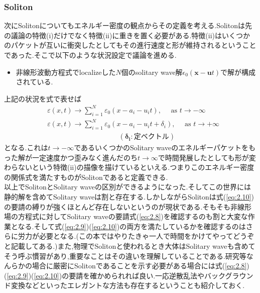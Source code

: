 \documentclass[dvipdfmx,11pt,a4paper]{jsbook}
\begin{document}
\subsubsection{Soliton}
次にSolitonについてもエネルギー密度の観点からその定義を考える.Solitonは先の議論の特徴(i)だけでなく特徴(ii)に重きを置く必要がある.特徴(ii)はいくつかのパケットが互いに衝突したとしてもその進行速度と形が維持されるということであった.そこで以下のような状況設定で議論を進める.
\begin{itemize}
    \item 非線形波動方程式でlocalizeした$N$個のsolitary wave解$\epsilon_0(\bm{x}-\bm{u}t)$で解が構成されている.
\end{itemize}
上記の状況を式で表せば
\begin{align}
     & \varepsilon(x, t) \rightarrow \sum_{i=1}^{N} \varepsilon_{0}\left(x-a_{i}-u_{i} t\right), \quad \text { as } t \rightarrow-\infty\label{eq:2.9}             \\
     & \varepsilon(x, t) \rightarrow \sum_{i=1}^{N} \varepsilon_{0}\left(x-a_{i}-u_{i} t+\delta_{i}\right), \quad \text { as } t \rightarrow+\infty\label{eq:2.10} \\
     & \qquad \ \ \ \ \ \ \ \ \ \ \ \ \ \ \ \ \ \ \ \ \  \ \ \ \ \ \ \ \ \ \ \ \ \ \ \ \ (\bm{\delta_i}:\text{定ベクトル})\nonumber
\end{align}
となる.これは$t\rightarrow -\infty$であるいくつかのSolitary waveのエネルギーパケットをもった解が一定速度かつ歪みなく進んだのち$t\rightarrow \infty$で時間発展したとしても形が変わらないという特徴(ii)の描像を描けているといえる.つまりこのエネルギー密度の関係式を満たすものがSolitonであると定義できる.\\

以上でSolitonとSolitary waveの区別ができるようになった.そしてこの世界には静的解を含めてSolitary waveは割と存在する.しかしながらSolitonは式(\ref{eq:2.10})の要請の縛りが強くほとんど存在しないというのが現状である.そもそも非線形場の方程式に対してSolitary waveの要請式(\ref{eq:2.8})を確認するのも割と大変な作業となる.そして式(\ref{eq:2.9})(\ref{eq:2.10})の両方を満たしているかを確認するのはさらに労力が必要となる.(この本ではやりたきゃ一人で時間をかけてやってどうぞと記載してある.)また,物理でSolitonと使われるとき大体はSolitary waveも含めてそう呼ぶ慣習があり,重要なことはその違いを理解していることである.研究等なんらかの場合に厳密にSolitonであることを示す必要がある場合には式(\ref{eq:2.8})(\ref{eq:2.9})(\ref{eq:2.10})の要請を確かめられれば良い.一応逆散乱法やバックグラウンド変換などといったエレガントな方法も存在するということも紹介しておく.
\end{document}
